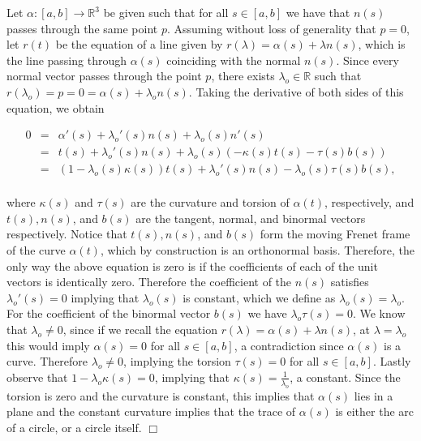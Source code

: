 \documentclass{article}
\begin{document}
\noindent Let $\alpha: [a,b] \to \mathbb{R}^3$ be given such that for all $s \in [a,b]$ we have that $n(s)$ passes through the same point $p$.  Assuming without loss of generality that $p=0$, let $r(t)$ be the equation of a line given by $r(\lambda) = \alpha(s) + \lambda n(s)$, which is the line passing through $\alpha(s)$ coinciding with the normal $n(s)$.  Since every normal vector passes through the point $p$, there exists $\lambda_o \in \mathbb{R}$ such that $r(\lambda_o) = p = 0 = \alpha(s) + \lambda_o n(s)$.  Taking the derivative of both sides of this equation, we obtain

\begin{eqnarray*}
0 & = & \alpha'(s) + \lambda_o'(s) n(s) + \lambda_o(s) n'(s) \\
& = & t(s) + \lambda_o'(s)n(s) +  \lambda_o(s)(-\kappa(s) t(s) - \tau(s) b(s)) \\
& = & (1 - \lambda_o(s) \kappa(s)) t(s) + \lambda_o'(s) n(s) - \lambda_o(s)\tau(s) b(s), \\
\end{eqnarray*}

\noindent where $\kappa(s)$ and $\tau(s)$ are the curvature and torsion of $\alpha(t)$, respectively, and $t(s), n(s)$, and $b(s)$ are the tangent, normal, and binormal vectors respectively.  Notice that $t(s), n(s)$, and $b(s)$ form the moving Frenet frame of the curve $\alpha(t)$, which by construction is an orthonormal basis.  Therefore, the only way the above equation is zero is if the coefficients of each of the unit vectors is identically zero.  Therefore the coefficient of the $n(s)$ satisfies $\lambda_o'(s) = 0$ implying that $\lambda_o(s)$ is constant, which we define as $\lambda_o(s) = \lambda_o$.  For the coefficient of the binormal vector $b(s)$ we have $\lambda_o \tau(s) = 0$.  We know that $\lambda_o \neq 0$, since if we recall the equation $r(\lambda) = \alpha(s) + \lambda n(s)$, at $\lambda = \lambda_o$ this would imply $\alpha(s) = 0$ for all $s \in [a,b]$, a contradiction since $\alpha(s)$ is a curve.  Therefore $\lambda_o \neq 0$, implying the torsion $\tau(s) = 0$ for all $s \in [a,b]$.  Lastly observe that $1 - \lambda_o \kappa(s) = 0$, implying that $\kappa(s) = \frac{1}{\lambda_o}$, a constant.  Since the torsion is zero and the curvature is constant, this implies that $\alpha(s)$ lies in a plane and the constant curvature implies that the trace of $\alpha(s)$ is either the arc of a circle, or a circle itself.  \hfill $\Box$

\end{document}
